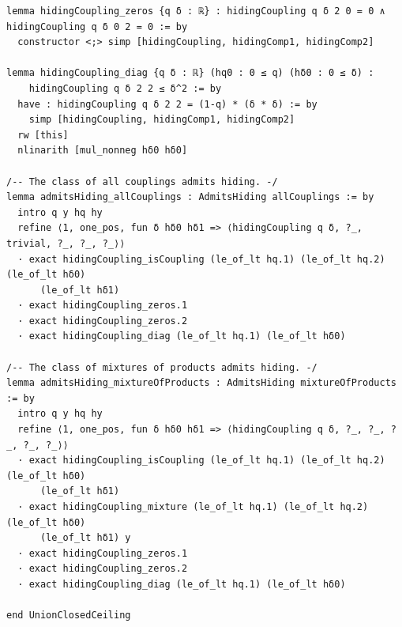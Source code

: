 \documentclass[11pt,a4paper]{article}
\theoremstyle{definition}
\theoremstyle{remark}
\begin{document}
\begin{Verbatim}[fontsize=\scriptsize,formatcom=\leanmono,samepage=false]
lemma hidingCoupling_zeros {q δ : ℝ} : hidingCoupling q δ 2 0 = 0 ∧ hidingCoupling q δ 0 2 = 0 := by
  constructor <;> simp [hidingCoupling, hidingComp1, hidingComp2]

lemma hidingCoupling_diag {q δ : ℝ} (hq0 : 0 ≤ q) (hδ0 : 0 ≤ δ) :
    hidingCoupling q δ 2 2 ≤ δ^2 := by
  have : hidingCoupling q δ 2 2 = (1-q) * (δ * δ) := by
    simp [hidingCoupling, hidingComp1, hidingComp2]
  rw [this]
  nlinarith [mul_nonneg hδ0 hδ0]

/-- The class of all couplings admits hiding. -/
lemma admitsHiding_allCouplings : AdmitsHiding allCouplings := by
  intro q y hq hy
  refine ⟨1, one_pos, fun δ hδ0 hδ1 => ⟨hidingCoupling q δ, ?_, trivial, ?_, ?_, ?_⟩⟩
  · exact hidingCoupling_isCoupling (le_of_lt hq.1) (le_of_lt hq.2) (le_of_lt hδ0)
      (le_of_lt hδ1)
  · exact hidingCoupling_zeros.1
  · exact hidingCoupling_zeros.2
  · exact hidingCoupling_diag (le_of_lt hq.1) (le_of_lt hδ0)

/-- The class of mixtures of products admits hiding. -/
lemma admitsHiding_mixtureOfProducts : AdmitsHiding mixtureOfProducts := by
  intro q y hq hy
  refine ⟨1, one_pos, fun δ hδ0 hδ1 => ⟨hidingCoupling q δ, ?_, ?_, ?_, ?_, ?_⟩⟩
  · exact hidingCoupling_isCoupling (le_of_lt hq.1) (le_of_lt hq.2) (le_of_lt hδ0)
      (le_of_lt hδ1)
  · exact hidingCoupling_mixture (le_of_lt hq.1) (le_of_lt hq.2) (le_of_lt hδ0)
      (le_of_lt hδ1) y
  · exact hidingCoupling_zeros.1
  · exact hidingCoupling_zeros.2
  · exact hidingCoupling_diag (le_of_lt hq.1) (le_of_lt hδ0)

end UnionClosedCeiling
\end{Verbatim}
\end{document}
